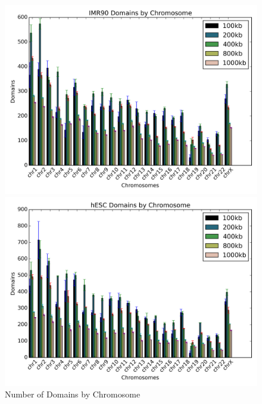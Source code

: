 \begin{figure}[H]
  \caption{Number of Domains by Chromosome}
  \begin{minipage}{0.45\textwidth}%
    \includegraphics[width=\textwidth]{./figures/results/domain_imr90_bar.png}
  \end{minipage}%
  \hfill
  \begin{minipage}{0.45\textwidth}
    \includegraphics[width=\textwidth]{./figures/results/domain_hesc_bar.png}
  \end{minipage}
\end{figure}
